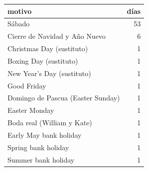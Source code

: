 \begin{tabular}{lr}
\toprule
motivo & días \\
\midrule
Sábado & 53 \\
Cierre de Navidad y Año Nuevo & 6 \\
Christmas Day (sustituto) & 1 \\
Boxing Day (sustituto) & 1 \\
New Year's Day (sustituto) & 1 \\
Good Friday & 1 \\
Domingo de Pascua (Easter Sunday) & 1 \\
Easter Monday & 1 \\
Boda real (William y Kate) & 1 \\
Early May bank holiday & 1 \\
Spring bank holiday & 1 \\
Summer bank holiday & 1 \\
\bottomrule
\end{tabular}
